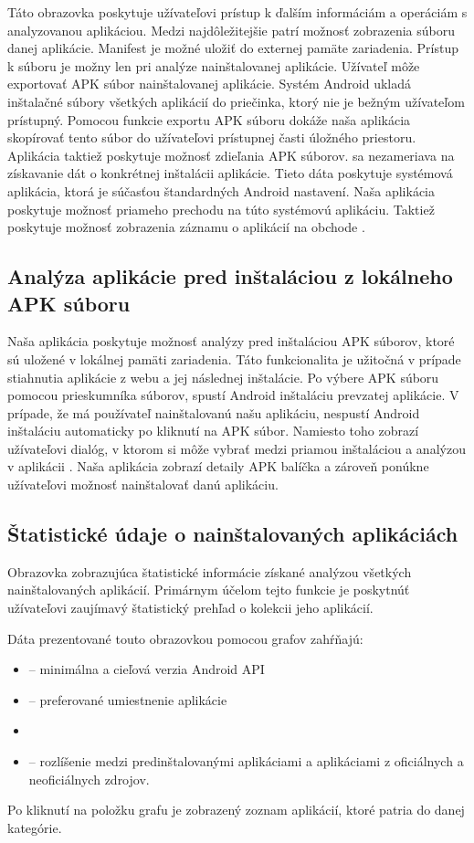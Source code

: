 Táto obrazovka poskytuje užívateľovi prístup k ďalším informáciám a operáciám s analyzovanou aplikáciou. Medzi najdôležitejšie patrí možnosť zobrazenia súboru  danej aplikácie. Manifest je možné uložiť do externej pamäte zariadenia. Prístup k súboru  je možny len pri analýze nainštalovanej aplikácie.
Užívateľ môže exportovať APK súbor nainštalovanej aplikácie. Systém Android ukladá inštalačné súbory všetkých aplikácií do priečinka, ktorý nie je bežným užívateľom prístupný. Pomocou funkcie exportu APK súboru dokáže naša aplikácia skopírovať tento súbor do užívateľovi prístupnej časti úložného priestoru. Aplikácia taktiež poskytuje možnosť zdieľania APK súborov. 
 sa nezameriava na získavanie dát o konkrétnej inštalácii aplikácie. Tieto dáta poskytuje systémová aplikácia, ktorá je súčasťou štandardných Android nastavení. Naša aplikácia poskytuje možnosť priameho prechodu na túto systémovú aplikáciu.  Taktiež poskytuje možnosť zobrazenia záznamu o aplikácií na obchode .

\subsection{Analýza aplikácie pred inštaláciou z lokálneho APK súboru}
Naša aplikácia poskytuje možnosť analýzy pred inštaláciou APK súborov, ktoré sú uložené v lokálnej pamäti zariadenia. Táto funkcionalita je užitočná v prípade stiahnutia aplikácie z webu a jej následnej inštalácie. Po výbere APK súboru pomocou prieskumníka súborov, spustí Android inštaláciu prevzatej aplikácie. V prípade, že má používateľ nainštalovanú našu aplikáciu, nespustí Android inštaláciu automaticky po kliknutí na APK súbor. Namiesto toho zobrazí užívateľovi dialóg, v ktorom si môže vybrať medzi priamou inštaláciou a analýzou v aplikácii . Naša aplikácia zobrazí detaily APK balíčka a zároveň ponúkne užívateľovi možnosť nainštalovať danú aplikáciu.

\subsection{Štatistické údaje o nainštalovaných aplikáciách}
Obrazovka zobrazujúca štatistické informácie získané analýzou všetkých nainštalovaných aplikácií. Primárnym účelom tejto funkcie je poskytnúť užívateľovi zaujímavý štatistický prehľad o kolekcii jeho aplikácií. 

\noindent Dáta prezentované touto obrazovkou pomocou grafov zahŕňajú:
\begin{itemize}
	\item {} -- minimálna a cieľová verzia Android API
	\item {} -- preferované umiestnenie aplikácie
	\item {}
	\item {} -- rozlíšenie medzi predinštalovanými aplikáciami a aplikáciami z oficiálnych a neoficiálnych zdrojov. 
\end{itemize}
\noindent Po kliknutí na položku grafu je zobrazený zoznam aplikácií, ktoré patria do danej kategórie.

